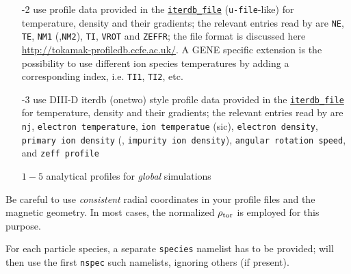 \documentclass[12pt]{article}
\begin{document}
\begin{description}
\begin{itemize}
 \item[-2] use profile data provided in the \hyperlink{iterdb_file}{\tt iterdb\_file} ({\tt u-file}-like)
  for temperature, density and their gradients; the relevant entries read by \gene are {\tt NE},
  {\tt TE}, {\tt NM1} (,{\tt NM2}), {\tt TI}, {\tt VROT} and {\tt ZEFFR}; the file format is discussed
  here \url{http://tokamak-profiledb.ccfe.ac.uk/}. A {\sc GENE} specific extension is the possibility to
  use different ion species temperatures by adding a corresponding index, i.e. {\tt TI1}, {\tt TI2}, etc.
 \item[-3] use DIII-D iterdb (onetwo) style profile data provided in the
  \hyperlink{iterdb_file}{\tt iterdb\_file} for temperature, density and their gradients;
  the relevant entries read by \gene are {\tt nj}, {\tt electron temperature}, {\tt ion temperatue}
  (sic), {\tt electron density}, {\tt primary ion density} (, {\tt impurity ion density}),
  {\tt angular rotation speed}, and {\tt zeff profile}
 \item[$1-5$] analytical profiles for {\em global} simulations
\end{itemize}
Be careful to use {\em consistent} radial coordinates in your profile files and the magnetic geometry. In most cases, the normalized $\rho_{\rm tor}$ is employed for this purpose.
\end{description}
For each particle species, a separate \texttt{species} namelist has to be provided; \gene will then use
the first \texttt{nspec} such namelists, ignoring others (if present).
\end{document}
